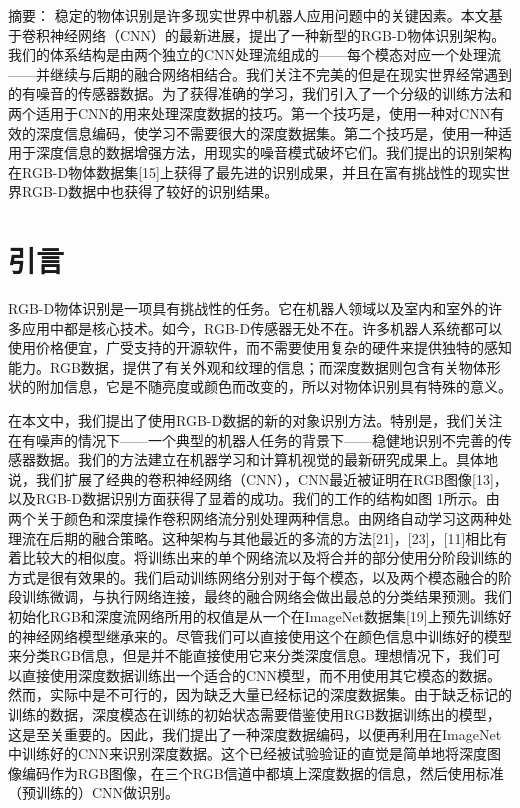 {\heiti 摘要：}
稳定的物体识别是许多现实世界中机器人应用问题中的关键因素。本文基于卷积神经网络（CNN）的最新进展，提出了一种新型的RGB-D物体识别架构。我们的体系结构是由两个独立的CNN处理流组成的——每个模态对应一个处理流——并继续与后期的融合网络相结合。我们关注不完美的但是在现实世界经常遇到的有噪音的传感器数据。为了获得准确的学习，我们引入了一个分级的训练方法和两个适用于CNN的用来处理深度数据的技巧。第一个技巧是，使用一种对CNN有效的深度信息编码，使学习不需要很大的深度数据集。第二个技巧是，使用一种适用于深度信息的数据增强方法，用现实的噪音模式破坏它们。我们提出的识别架构在RGB-D物体数据集[15]上获得了最先进的识别成果，并且在富有挑战性的现实世界RGB-D数据中也获得了较好的识别结果。

\section{引言}

RGB-D物体识别是一项具有挑战性的任务。它在机器人领域以及室内和室外的许多应用中都是核心技术。如今，RGB-D传感器无处不在。许多机器人系统都可以使用价格便宜，广受支持的开源软件，而不需要使用复杂的硬件来提供独特的感知能力。RGB数据，提供了有关外观和纹理的信息；而深度数据则包含有关物体形状的附加信息，它是不随亮度或颜色而改变的，所以对物体识别具有特殊的意义。

在本文中，我们提出了使用RGB-D数据的新的对象识别方法。特别是，我们关注在有噪声的情况下——一个典型的机器人任务的背景下——稳健地识别不完善的传感器数据。我们的方法建立在机器学习和计算机视觉的最新研究成果上。具体地说，我们扩展了经典的卷积神经网络（CNN），CNN最近被证明在RGB图像[13]，以及RGB-D数据识别方面获得了显着的成功。我们的工作的结构如图 1所示。由两个关于颜色和深度操作卷积网络流分别处理两种信息。由网络自动学习这两种处理流在后期的融合策略。这种架构与其他最近的多流的方法[21]，[23]，[11]相比有着比较大的相似度。将训练出来的单个网络流以及将合并的部分使用分阶段训练的方式是很有效果的。我们启动训练网络分别对于每个模态，以及两个模态融合的阶段训练微调，与执行网络连接，最终的融合网络会做出最总的分类结果预测。我们初始化RGB和深度流网络所用的权值是从一个在ImageNet数据集[19]上预先训练好的神经网络模型继承来的。尽管我们可以直接使用这个在颜色信息中训练好的模型来分类RGB信息，但是并不能直接使用它来分类深度信息。理想情况下，我们可以直接使用深度数据训练出一个适合的CNN模型，而不用使用其它模态的数据。然而，实际中是不可行的，因为缺乏大量已经标记的深度数据集。由于缺乏标记的训练的数据，深度模态在训练的初始状态需要借鉴使用RGB数据训练出的模型，这是至关重要的。因此，我们提出了一种深度数据编码，以便再利用在ImageNet中训练好的CNN来识别深度数据。这个已经被试验验证的直觉是简单地将深度图像编码作为RGB图像，在三个RGB信道中都填上深度数据的信息，然后使用标准（预训练的）CNN做识别。

